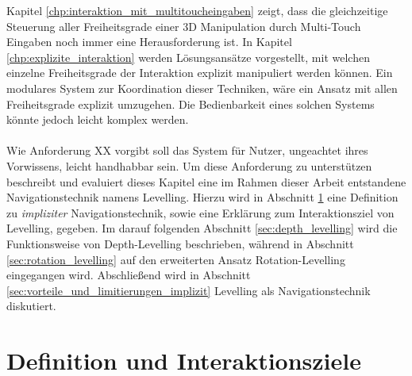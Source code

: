 Kapitel \ref{chp:interaktion_mit_multitoucheingaben} zeigt, dass die gleichzeitige Steuerung aller Freiheitsgrade einer 3D Manipulation durch Multi-Touch Eingaben noch immer eine Herausforderung ist. In Kapitel \ref{chp:explizite_interaktion} werden Lösungsansätze vorgestellt, mit welchen einzelne Freiheitsgrade der Interaktion explizit manipuliert werden können. Ein modulares System zur Koordination dieser Techniken, wäre ein Ansatz mit allen Freiheitsgrade explizit umzugehen. Die Bedienbarkeit eines solchen Systems könnte jedoch leicht komplex werden.
\\\\
Wie Anforderung XX vorgibt soll das System für Nutzer, ungeachtet ihres Vorwissens, leicht handhabbar sein. Um diese Anforderung zu unterstützen beschreibt und evaluiert dieses Kapitel eine im Rahmen dieser Arbeit entstandene Navigationstechnik namens Levelling. Hierzu wird in Abschnitt \ref{sec:definition_levelling} eine Definition zu \emph{impliziter} Navigationstechnik, sowie eine Erklärung zum Interaktionsziel von Levelling, gegeben. Im darauf folgenden Abschnitt \ref{sec:depth_levelling} wird die Funktionsweise von Depth-Levelling beschrieben, während in Abschnitt \ref{sec:rotation_levelling} auf den erweiterten Ansatz Rotation-Levelling eingegangen wird. Abschließend wird in Abschnitt \ref{sec:vorteile_und_limitierungen_implizit} Levelling als Navigationstechnik diskutiert.


\section{Definition und Interaktionsziele}
\label{sec:definition_levelling}

